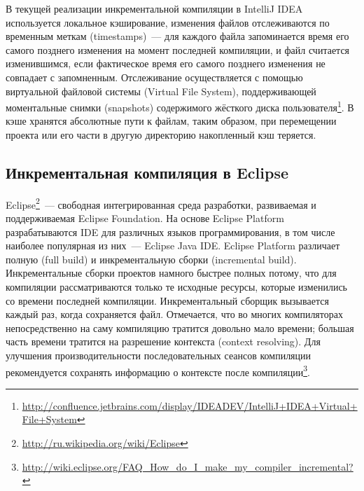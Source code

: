 В текущей реализации инкрементальной компиляции в IntelliJ IDEA используется локальное кэширование, изменения файлов отслеживаются по временным меткам (timestamps)~--- для каждого файла запоминается время его самого позднего изменения на момент последней компиляции, и файл считается изменившимся, если фактическое время его самого позднего изменения не совпадает с запомненным. Отслеживание осуществляется с помощью виртуальной файловой системы (Virtual File System), поддерживающей моментальные снимки (snapshots) содержимого жёсткого диска пользователя\footnote{\url{http://confluence.jetbrains.com/display/IDEADEV/IntelliJ+IDEA+Virtual+File+System}}. В кэше хранятся абсолютные пути к файлам, таким образом, при перемещении проекта или его части в другую директорию накопленный кэш теряется.

\subsection{Инкрементальная компиляция в Eclipse}
Eclipse\footnote{\url{http://ru.wikipedia.org/wiki/Eclipse}}~--- свободная интегрированная среда разработки, развиваемая и поддерживаемая Eclipse Foundation. На основе Eclipse Platform разрабатываются IDE для различных языков программирования, в том числе наиболее популярная из них~--- Eclipse Java IDE.
Eclipse Platform различает полную (full build) и инкрементальную сборки (incremental build). Инкрементальные сборки проектов намного быстрее полных потому, что для компиляции рассматриваются только те исходные ресурсы, которые изменились со времени последней компиляции.
Инкрементальный сборщик вызывается каждый раз, когда сохраняется файл. Отмечается, что во многих компиляторах непосредственно на саму компиляцию тратится довольно мало времени; большая часть времени тратится на разрешение контекста (context resolving). Для улучшения производительности последовательных сеансов компиляции рекомендуется сохранять информацию о контексте после компиляции\footnote{\url{http://wiki.eclipse.org/FAQ_How_do_I_make_my_compiler_incremental?}}.

